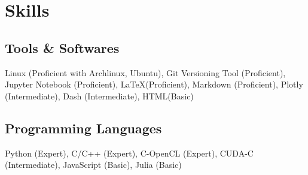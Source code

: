 \documentclass[]{resume}
\begin{document}
\begin{minipage}[t]{0.5\textwidth}
    \section{Skills}

    \subsection{Tools \& Softwares}
    Linux (Proficient with Archlinux, Ubuntu),
    Git Versioning Tool (Proficient),
    Jupyter Notebook (Proficient),
    \LaTeX (Proficient),
    Markdown (Proficient),
    Plotly (Intermediate),
    Dash (Intermediate),
    HTML(Basic)\\

    \subsection{Programming Languages}
    Python (Expert), C/C++ (Expert), C-OpenCL (Expert), CUDA-C (Intermediate), JavaScript (Basic), Julia (Basic)


\end{minipage}
\hfill
\end{document}
